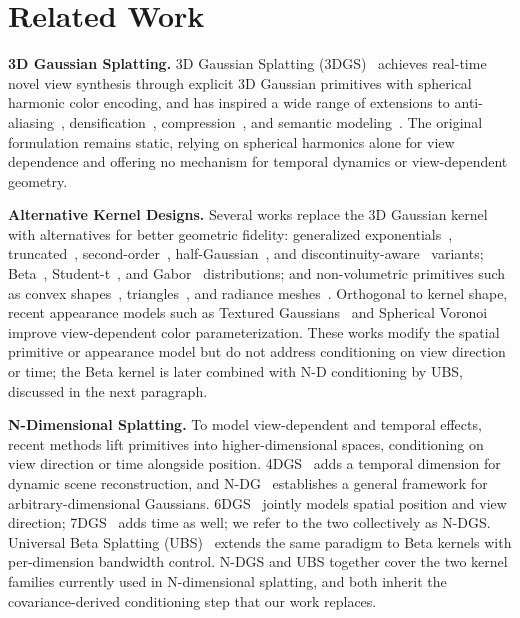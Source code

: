 \documentclass{article}
\theoremstyle{plain}
\theoremstyle{definition}
\theoremstyle{remark}
\begin{document}
\section{Related Work}
\label{sec:related_work}

\textbf{3D Gaussian Splatting.}
3D Gaussian Splatting (3DGS)~\citep{3dgs} achieves real-time novel view synthesis through explicit 3D Gaussian primitives with spherical harmonic color encoding, and has inspired a wide range of extensions to anti-aliasing~\citep{yu2023mipsplattingaliasfree3dgaussian,yan2024multiscale3dgaussiansplatting}, densification~\citep{kheradmand20243dgaussiansplattingmarkov}, compression~\citep{lee2024compact,morgenstern2024compact}, and semantic modeling~\citep{shi2023languageembedded3dgaussians,zhou2024feature3dgssupercharging3d}. The original formulation remains static, relying on spherical harmonics alone for view dependence and offering no mechanism for temporal dynamics or view-dependent geometry.

\textbf{Alternative Kernel Designs.}
Several works replace the 3D Gaussian kernel with alternatives for better geometric fidelity: generalized exponentials~\citep{hamdi2024gesgeneralizedexponentialsplatting}, truncated~\citep{liu2025tnt}, second-order~\citep{zhang2025quadratic}, half-Gaussian~\citep{li20253d}, and discontinuity-aware~\citep{qu2024disc} variants; Beta~\citep{liu2025deformable}, Student-t~\citep{zhu20253dstudentsplattingscooping}, and Gabor~\citep{zhou20253dgabsplat3dgaborsplatting} distributions; and non-volumetric primitives such as convex shapes~\citep{held20243dconvexsplattingradiance}, triangles~\citep{held2025triangle}, and radiance meshes~\citep{radiancemesh}. Orthogonal to kernel shape, recent appearance models such as Textured Gaussians~\citep{chao2025textured} and Spherical Voronoi~\citep{di2025spherical} improve view-dependent color parameterization. These works modify the spatial primitive or appearance model but do not address conditioning on view direction or time; the Beta kernel is later combined with N-D conditioning by UBS, discussed in the next paragraph.

\textbf{N-Dimensional Splatting.}
To model view-dependent and temporal effects, recent methods lift primitives into higher-dimensional spaces, conditioning on view direction or time alongside position. 4DGS~\citep{yang2023real} adds a temporal dimension for dynamic scene reconstruction, and N-DG~\citep{diolatzis2024n} establishes a general framework for arbitrary-dimensional Gaussians. 6DGS~\citep{gao20246dgs} jointly models spatial position and view direction; 7DGS~\citep{gao20257dgs} adds time as well; we refer to the two collectively as N-DGS. Universal Beta Splatting (UBS)~\citep{liu2025universal} extends the same paradigm to Beta kernels with per-dimension bandwidth control. N-DGS and UBS together cover the two kernel families currently used in N-dimensional splatting, and both inherit the covariance-derived conditioning step that our work replaces.
\end{document}
